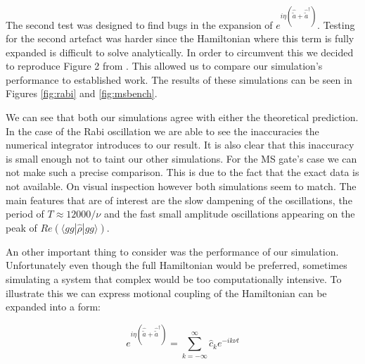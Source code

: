 \documentclass[12pt,twoside]{report}
\begin{document}
The second test was designed to find bugs in the expansion of $e^{i\eta\left(\hat{\tilde{a}}+\hat{\tilde{a}}^\dagger\right)}$. Testing for the second artefact was harder since the Hamiltonian where this term is fully expanded is difficult to solve analytically. In order to circumvent this we decided to reproduce Figure 2 from \cite{MS_gate}. This allowed us to compare our simulation's performance to established work. The results of these simulations can be seen in Figures \ref{fig:rabi} and \ref{fig:msbench}.

We can see that both our simulations agree with either the theoretical prediction. In the case of the Rabi oscillation we are able to see the inaccuracies the numerical integrator introduces to our result. It is also clear that this inaccuracy is small enough not to taint our other simulations. For the MS gate's case we can not make such a precise comparison. This is due to the fact that the exact data is not available. On visual inspection however both simulations seem to match. The main features that are of interest are the slow dampening of the oscillations, the period of $T \approx 12000/\nu$ and the fast small amplitude oscillations appearing on the peak of $Re(\langle gg|\hat{\rho}|gg\rangle)$.

An other important thing to consider was the performance of our simulation. Unfortunately even though the full Hamiltonian would be preferred, sometimes simulating a system that complex would be too computationally intensive. To illustrate this we can express motional coupling of the Hamiltonian can be expanded into a form:

\begin{equation}
	e^{i\eta\left(\hat{\tilde{a}}+\hat{\tilde{a}}^\dagger\right)} = \sum_{k=-\infty}^\infty \hat{c}_k e^{-ik\nu t}
	\label{eq:Mot_exp}
\end{equation}
\end{document}
